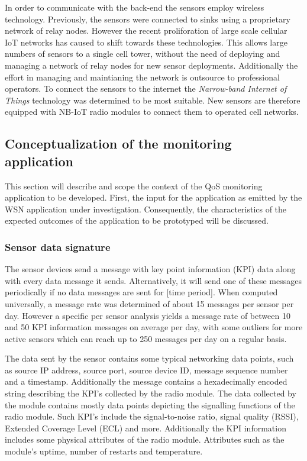 In order to communicate with the back-end the sensors employ wireless technology. Previously, the sensors were connected to sinks using a proprietary network of relay nodes. However the recent proliforation of large scale cellular IoT networks has caused \nedap to shift towards these technologies. This allows large numbers of sensors to a single cell tower, without the need of deploying and managing a network of relay nodes for new sensor deployments. Additionally the effort in managing and maintianing the network is outsource to professional operators. To connect the sensors to the internet the \emph{Narrow-band Internet of Things} technology was determined to be most suitable. New \sensit sensors are therefore equipped with \ublox \cite{web:ublox} NB-IoT radio modules to connect them to operated cell networks.

\subsection{Conceptualization of the monitoring application}
This section will describe and scope the context of the QoS monitoring application to be developed. First, the input for the application as  emitted by the WSN application under investigation. Consequently, the characteristics of the expected outcomes of the application to be prototyped will be discussed. 

\subsubsection{Sensor data signature}
The sensor devices send a message with key point information (KPI) data along with every data message it sends. Alternatively, it will send one of these messages periodically if no data messages are sent for [time period]. When computed universally, a message rate was determined of about 15 messages per sensor per day. However a specific per sensor analysis yields a message rate of between 10 and 50 KPI information messages on average per day, with some outliers for more active sensors which can reach up to 250 messages per day on a regular basis.

The data sent by the sensor contains some typical networking data points, such as source IP address, source port, source device ID, message sequence number and a timestamp. Additionally the message contains a hexadecimally encoded string describing the KPI's collected by the \ublox radio module. The data collected by the \ublox module contains mostly data points depicting the signalling functions of the radio module. Such KPI's include the signal-to-noise ratio, signal quality (RSSI), Extended Coverage Level (ECL)  and more. Additionally the KPI information includes some physical attributes of the radio module. Attributes such as the module's uptime, number of restarts and temperature. 

